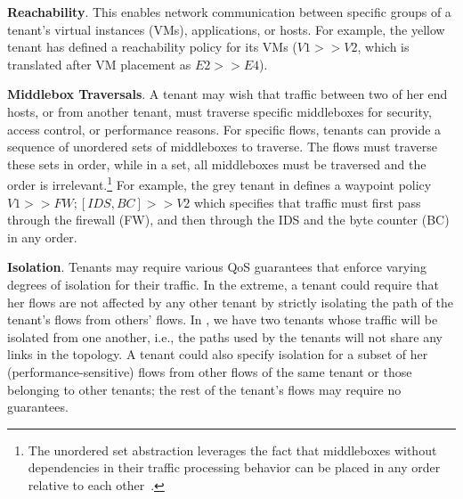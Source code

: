 \begin{compactitemize}
\item \textbf{Reachability}. This enables network communication
  between specific groups of a tenant's virtual instances (VMs),
  applications, or hosts. For example, the yellow tenant has defined a
  reachability policy for its VMs ($V1 >> V2$, which is translated
  after VM placement as $E2 >> E4$).
\item \textbf{Middlebox Traversals}. A tenant may wish that traffic
  between two of her end hosts, or from another tenant, must traverse
  specific middleboxes for %
  security, access control, or performance reasons. For specific
  flows, tenants can provide a sequence of unordered sets of
  middleboxes
  to traverse. The flows must traverse these sets in order, while in a
  set, all middleboxes must be traversed and the order is
  irrelevant.\footnote{The unordered set abstraction leverages the
    fact that middleboxes without dependencies in their traffic
    processing behavior can be placed in any order relative to each
    other~\cite{pga}.} For example, the grey tenant in
   defines a waypoint policy $V1 >> FW;
       [IDS,BC] >> V2$ which specifies that traffic must first pass
       through the firewall (FW), and then through the IDS and the
       byte counter (BC) in any order.


\item \textbf{Isolation}. Tenants may require various QoS guarantees
  that enforce varying degrees of isolation for their traffic. In the
  extreme, a tenant could require that her flows are not affected by
  any other tenant by strictly isolating the path of the tenant's
  flows from others' flows. In , we have two
  tenants whose traffic will be isolated from one another, i.e., the
  paths used by the tenants will not share any links in the topology.
  A tenant could also specify isolation for a subset of her
  (performance-sensitive) flows from other flows of the same tenant or
  those belonging to other tenants; the rest of the tenant's flows may
  require no guarantees.


\end{compactitemize}
